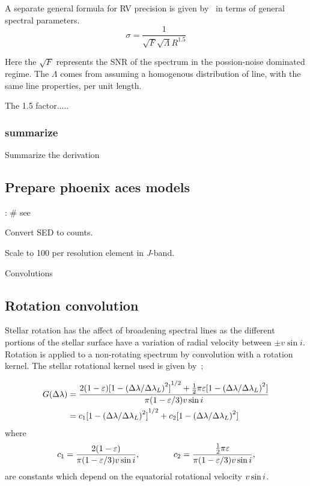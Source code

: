 A separate general formula for RV precision is given by~\citet{hatzes_spectrograph_1992} in terms of general spectral parameters.
\begin{equation}
\sigma = \frac{1}{\sqrt{F} \sqrt{\Lambda} {R}^{1.5}}
\end{equation}

Here the $\sqrt{F}$ represents the SNR of the spectrum in the possion-noise dominated regime.
The $\Lambda$ comes from assuming a homogenous distribution of line, with the same line properties, per unit length.


The 1.5 factor.....

\subsubsection{summarize}
Summarize the derivation

\subsection{Prepare phoenix aces models}:
\# see~\citet{figueira_radial_2016}

Convert SED to counts.


Scale to 100 \snr{} per resolution element in \emph{J}-band.

Convolutions

\subsection{Rotation convolution}
Stellar rotation has the affect of broadening spectral lines as the different portions of the stellar surface have a variation of radial velocity between \(\pm v \sin i\).
Rotation is applied to a non-rotating spectrum by convolution with a rotation kernel.
The stellar rotational kernel used is given by~\citet{gray_observation_2005};


\begin{align}
G(\Delta\lambda) &= \frac{2(1-\varepsilon){[1-{(\Delta\lambda /{\Delta\lambda}_{L})}^{2}]}^{1/2} +   \frac{1}{2}\pi\varepsilon[1-{(\Delta\lambda /{\Delta\lambda}_{L})}^{2}]}{\pi (1-\varepsilon/3)v\sin{i}}\\
      &= c_{1}{[1- {(\Delta\lambda /\Delta\lambda_{L})}^{2}]}^{1/2} + c_{2}[1-{(\Delta\lambda /\Delta\lambda_{L})}^{2}] \label{eqn:rotational_profile}
\end{align}
where
\begin{equation}
c_1 = \frac{2(1-\varepsilon)} {\pi (1-\varepsilon/3)v\sin{i}},  \hspace{4em} c_2 = \frac{\frac{1}{2}\pi\varepsilon} {\pi (1-\varepsilon/3)v\sin{i}},
\end{equation}
are constants which depend on the equatorial rotational velocity \(v\sin{i}\).


